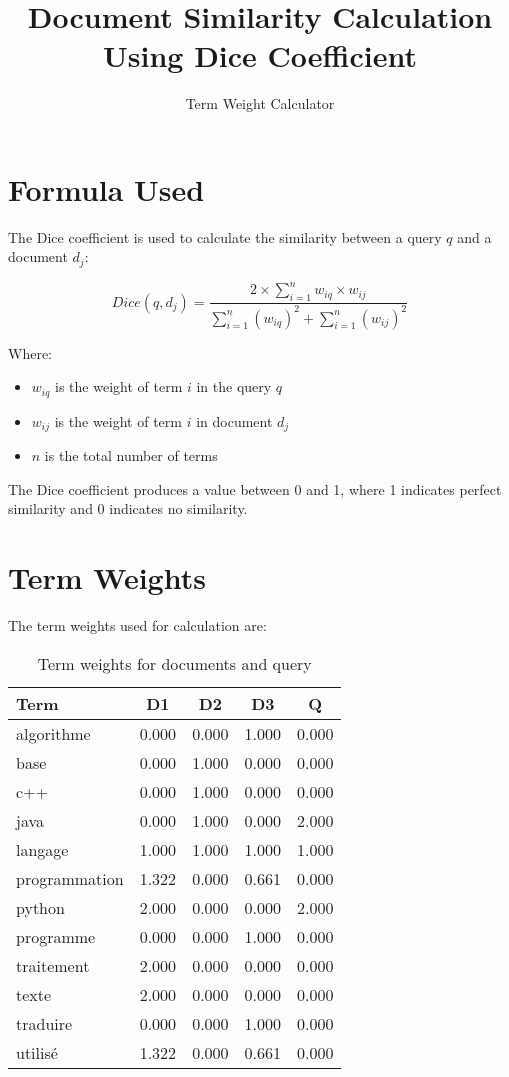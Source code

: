 \documentclass{article}
\begin{document}
\title{Document Similarity Calculation Using Dice Coefficient}
\author{Term Weight Calculator}
\maketitle

\section{Formula Used}
The Dice coefficient is used to calculate the similarity between a query $q$ and a document $d_j$:

\begin{equation}
Dice(q, d_j) = \frac{2 \times \sum_{i=1}^{n} w_{iq} \times w_{ij}}{\sum_{i=1}^{n} (w_{iq})^2 + \sum_{i=1}^{n} (w_{ij})^2}
\end{equation}

Where:
\begin{itemize}
\item $w_{iq}$ is the weight of term $i$ in the query $q$
\item $w_{ij}$ is the weight of term $i$ in document $d_j$
\item $n$ is the total number of terms
\end{itemize}

The Dice coefficient produces a value between 0 and 1, where 1 indicates perfect similarity and 0 indicates no similarity.

\section{Term Weights}
The term weights used for calculation are:

\begin{table}[h]
\centering
\begin{tabular}{lcccc}
\toprule
Term & D1 & D2 & D3 & Q \\
\midrule
algorithme & 0.000 & 0.000 & 1.000 & 0.000 \\
base & 0.000 & 1.000 & 0.000 & 0.000 \\
c++ & 0.000 & 1.000 & 0.000 & 0.000 \\
java & 0.000 & 1.000 & 0.000 & 2.000 \\
langage & 1.000 & 1.000 & 1.000 & 1.000 \\
programmation & 1.322 & 0.000 & 0.661 & 0.000 \\
python & 2.000 & 0.000 & 0.000 & 2.000 \\
programme & 0.000 & 0.000 & 1.000 & 0.000 \\
traitement & 2.000 & 0.000 & 0.000 & 0.000 \\
texte & 2.000 & 0.000 & 0.000 & 0.000 \\
traduire & 0.000 & 0.000 & 1.000 & 0.000 \\
utilis\'{e} & 1.322 & 0.000 & 0.661 & 0.000 \\
\bottomrule
\end{tabular}
\caption{Term weights for documents and query}
\end{table}
\end{document}
